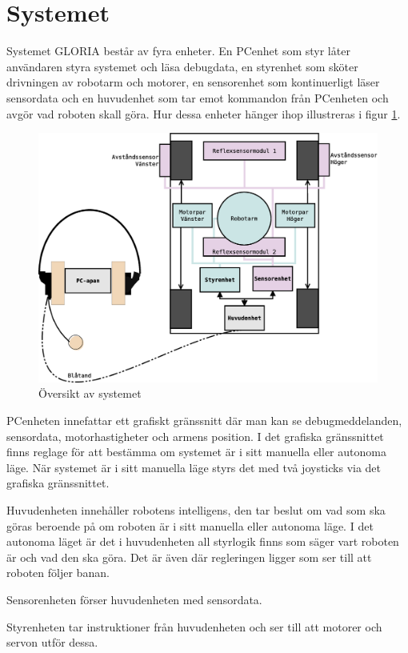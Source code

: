 
\section{Systemet}
Systemet GLORIA består av fyra enheter. En PCenhet som styr låter användaren styra systemet och läsa debugdata, en styrenhet som sköter drivningen av robotarm och motorer, en sensorenhet som kontinuerligt läser sensordata och en huvudenhet som tar emot kommandon från PCenheten och avgör vad roboten skall göra. Hur dessa enheter hänger ihop illustreras i figur \ref{system-oversikt}.

\begin{figure}[h!]
	\centering
	\includegraphics[scale=0.4]{grafik/system-oversikt}
	\caption{Översikt av systemet} \label{system-oversikt}
\end{figure}

PCenheten innefattar ett grafiskt gränssnitt där man kan se debugmeddelanden, sensordata, motorhastigheter och armens position. I det grafiska gränssnittet finns reglage för att bestämma om systemet är i sitt manuella eller autonoma läge. När systemet är i sitt manuella läge styrs det med två joysticks via det grafiska gränssnittet.

Huvudenheten innehåller robotens intelligens, den tar beslut om vad som ska göras beroende på om roboten är i sitt manuella eller autonoma läge. I det autonoma läget är det i huvudenheten all styrlogik finns som säger vart roboten är och vad den ska göra. Det är även där regleringen ligger som ser till att roboten följer banan.

Sensorenheten förser huvudenheten med sensordata.

Styrenheten tar instruktioner från huvudenheten och ser till att motorer och servon utför dessa.
